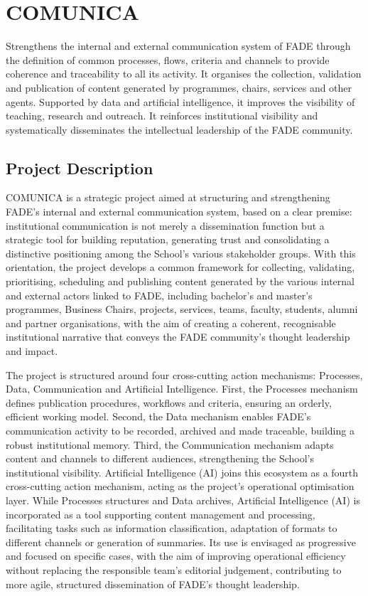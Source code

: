 \documentclass[11pt,a4paper]{scrreprt}
\begin{document}
\clearpage

\chapter[COMUNICA]{\textcolor{comcolor}{COMUNICA}}
\begin{tcolorbox}[descbox]
\small Strengthens the internal and external communication system of FADE through the definition of common processes, flows, criteria and channels to provide coherence and traceability to all its activity. It organises the collection, validation and publication of content generated by programmes, chairs, services and other agents. Supported by data and artificial intelligence, it improves the visibility of teaching, research and outreach. It reinforces institutional visibility and systematically disseminates the intellectual leadership of the FADE community.
\end{tcolorbox}
\section{Project Description}

\small
COMUNICA is a strategic project aimed at structuring and strengthening FADE's internal and external communication system, based on a clear premise: institutional communication is not merely a dissemination function but a strategic tool for building reputation, generating trust and consolidating a distinctive positioning among the School's various stakeholder groups. With this orientation, the project develops a common framework for collecting, validating, prioritising, scheduling and publishing content generated by the various internal and external actors linked to FADE, including bachelor's and master's programmes, Business Chairs, projects, services, teams, faculty, students, alumni and partner organisations, with the aim of creating a coherent, recognisable institutional narrative that conveys the FADE community's thought leadership and impact.

The project is structured around four cross-cutting action mechanisms: Processes, Data, Communication and Artificial Intelligence. First, the Processes mechanism defines publication procedures, workflows and criteria, ensuring an orderly, efficient working model. Second, the Data mechanism enables FADE's communication activity to be recorded, archived and made traceable, building a robust institutional memory. Third, the Communication mechanism adapts content and channels to different audiences, strengthening the School's institutional visibility. Artificial Intelligence (AI) joins this ecosystem as a fourth cross-cutting action mechanism, acting as the project's operational optimisation layer. While Processes structures and Data archives, Artificial Intelligence (AI) is incorporated as a tool supporting content management and processing, facilitating tasks such as information classification, adaptation of formats to different channels or generation of summaries. Its use is envisaged as progressive and focused on specific cases, with the aim of improving operational efficiency without replacing the responsible team's editorial judgement, contributing to more agile, structured dissemination of FADE's thought leadership.
\end{document}
